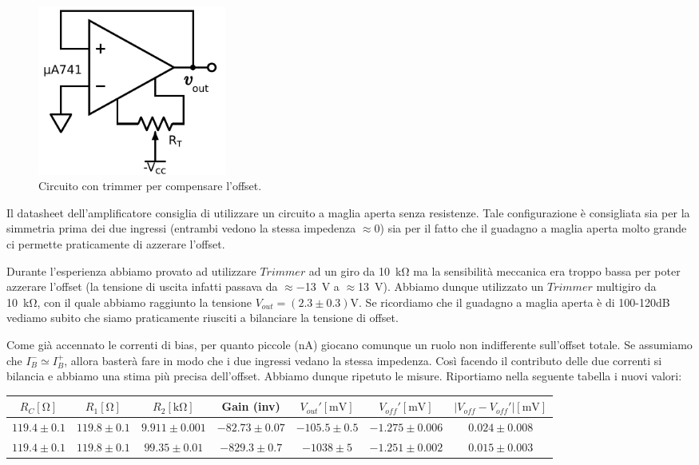 \begin{figure}
  \begin{center}
    \includegraphics[width=0.30\textwidth]{../E02/latex/trimmer_correction.pdf}
  \end{center}
  \caption{Circuito con trimmer per compensare l'offset.}
        \label{cir:trimmer}
\end{figure}





Il datasheet dell'amplificatore consiglia di utilizzare un circuito a maglia aperta senza resistenze. Tale configurazione è consigliata sia per la simmetria prima dei due ingressi (entrambi vedono la stessa impedenza $\approx 0$) sia per il fatto che il guadagno a maglia aperta molto grande ci permette praticamente di azzerare l'offset. 

Durante l'esperienza abbiamo provato ad utilizzare $Trimmer$ ad un giro da \SI{10}{\kilo\ohm} ma la sensibilità meccanica era troppo bassa per poter azzerare l'offset (la tensione di uscita infatti passava da $\approx$\SI{-13}{\volt} a $\approx$\SI{+13}{\volt}). Abbiamo dunque utilizzato un $Trimmer$ multigiro da \SI{10}{\kilo\ohm}, con il quale abbiamo raggiunto la tensione $V_{out}= (2.3\pm0.3)\si{\volt}$. Se ricordiamo che il guadagno a maglia aperta è di 100-120dB vediamo subito che siamo praticamente riusciti a bilanciare la tensione di offset.

Come già accennato le correnti di bias, per quanto piccole (\si{\nano\ampere}) giocano comunque un ruolo non indifferente sull'offset totale. Se assumiamo che $I_B^- \simeq I_B^+ $, allora basterà fare in modo che i due ingressi vedano la stessa impedenza. Così facendo il contributo delle due correnti si bilancia e abbiamo una stima più precisa dell'offset. Abbiamo dunque ripetuto le misure. Riportiamo nella seguente tabella i nuovi valori:



\begin{tabular}{c|c|c|c|c|c|c}
$R_C [\si{\ohm}]$& $R_1[\si{\ohm}]$ & $R_2[\si{\kilo\ohm}]$ & Gain (inv) & $V_{out}' [\si{\milli\volt}]$ & $V_{off}' [\si{\milli\volt}]$ & $|V_{off}-V_{off}'|[\si{\milli\volt}]$ \\ 
\hline 
$119.4\pm0.1$ & $119.8\pm0.1$ & $9.911\pm0.001$  & $-82.73\pm0.07$ & $-105.5 \pm 0.5$ & $-1.275 \pm0.006$ & $0.024\pm0.008$ \\
\hline
$119.4\pm0.1$ & $119.8\pm0.1$ & $99.35\pm0.01$  & $-829.3\pm0.7$ &$ -1038 \pm 5$ & $-1.251 \pm 0.002$ & $0.015 \pm 0.003 $	\\

\end{tabular}


